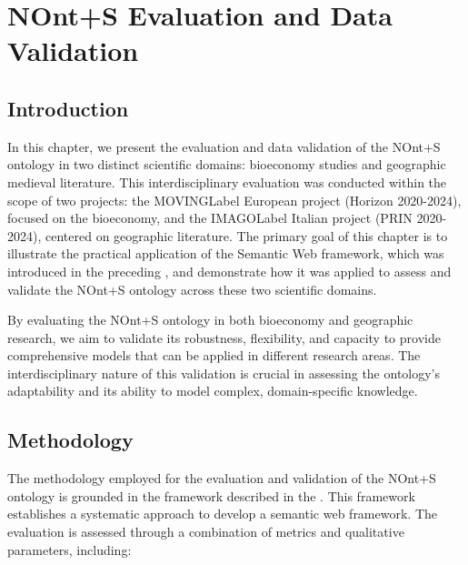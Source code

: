 
\chapter{NOnt+S Evaluation and Data Validation}\label{chap:evaluation}

\section{Introduction}\label{VII-sec:introduction}

In this chapter, we present the evaluation and data validation of the NOnt+S ontology in two distinct scientific domains: bioeconomy studies and geographic medieval literature. This interdisciplinary evaluation was conducted within the scope of two projects: the \acrshort{MOVINGLabel} European project (Horizon 2020-2024), focused on the bioeconomy, and the \acrshort{IMAGOLabel} Italian project (PRIN 2020-2024), centered on geographic literature. The primary goal of this chapter is to illustrate the practical application of the Semantic Web framework, which was introduced in the preceding , and demonstrate how it was applied to assess and validate the NOnt+S ontology across these two scientific domains.

By evaluating the NOnt+S ontology in both bioeconomy and geographic research, we aim to validate its robustness, flexibility, and capacity to provide comprehensive models that can be applied in different research areas. The interdisciplinary nature of this validation is crucial in assessing the ontology’s adaptability and its ability to model complex, domain-specific knowledge. 

\section{Methodology}\label{VII-sec:methodology}

The methodology employed for the evaluation and validation of the NOnt+S ontology is grounded in the framework described in the . This framework establishes a systematic approach to develop a semantic web framework. The evaluation is assessed through a combination of metrics and qualitative parameters, including:

